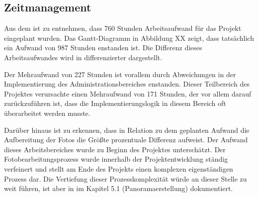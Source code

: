 \subsection{Zeitmanagement}
\label{sec:Zeitmanagement}

Aus dem  ist zu entnehmen, dass 760 Stunden Arbeitsaufwand für das Projekt
eingeplant wurden. Das Gantt-Diagramm in Abbildung XX zeigt, dass tatsächlich
ein Aufwand von 987 Stunden enstanden ist.
Die Differenz dieses Arbeitsaufwandes wird in  differenzierter dargestellt.



Der Mehraufwand von 227 Stunden ist vorallem durch Abweichungen in der Implementierung des Administrationsbereiches
enstanden. Dieser Teilbereich des Projektes verursachte einen Mehraufwand von
171 Stunden, der vor allem darauf zurückzuführen ist, dass die Implementierungslogik in diesem Bereich oft überarbeitet werden musste.

Darüber hinaus ist zu erkennen, dass in Relation zu dem geplanten Aufwand die Aufbereitung der Fotos die Größte
prozentuale Differenz aufweist. Der Aufwand dieses Arbeitsbereiches wurde zu Beginn des Projektes unterschätzt.
Der Fotobearbeitungsprozess wurde innerhalb der Projektentwicklung ständig verfeinert und stellt am Ende des Projekts
einen komplexen eigenständigen Prozess dar. Die Vertiefung dieser Prozesskomplexität würde an dieser Stelle zu weit
führen, ist aber in \citet{modelierungUndBetrieb2014} im Kapitel 5.1 (Panoramaerstellung) dokumentiert.